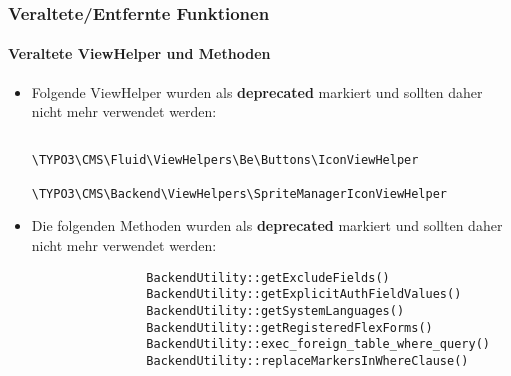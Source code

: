 
\begin{frame}[fragile]
	\frametitle{Veraltete/Entfernte Funktionen}
	\framesubtitle{Veraltete ViewHelper und Methoden}


	\begin{itemize}

		\item Folgende ViewHelper wurden als \textbf{deprecated} markiert und sollten daher nicht mehr verwendet werden:

			\begin{lstlisting}
				\TYPO3\CMS\Fluid\ViewHelpers\Be\Buttons\IconViewHelper
				\TYPO3\CMS\Backend\ViewHelpers\SpriteManagerIconViewHelper
			\end{lstlisting}

		\item Die folgenden Methoden wurden als \textbf{deprecated} markiert und sollten daher nicht mehr verwendet werden:

			\begin{lstlisting}
				BackendUtility::getExcludeFields()
				BackendUtility::getExplicitAuthFieldValues()
				BackendUtility::getSystemLanguages()
				BackendUtility::getRegisteredFlexForms()
				BackendUtility::exec_foreign_table_where_query()
				BackendUtility::replaceMarkersInWhereClause()
			\end{lstlisting}

	\end{itemize}

\end{frame}

